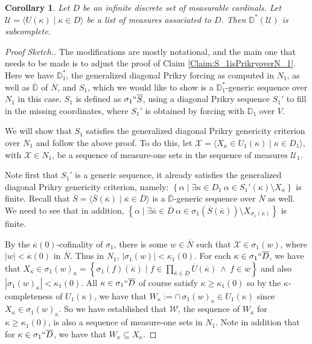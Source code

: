 \documentclass{amsart}
\newtheorem{corollary}[theorem]{Corollary}
\theoremstyle{definition}
\theoremstyle{remark}
\newcommand{\D}{\mathbb{D}}
\newcommand{\N}{{\overline{N}}}
\renewcommand{\S}{{\overline{S}}}
\newcommand{\U}{\mathcal{U}}
\newcommand{\st}{\; | \;}
\newcommand{\set}[2]{\left\{#1\st #2 \right\}}
\newcommand{\seq}[2]{\langle #1 \st #2 \rangle}
\begin{document}
\begin{corollary} 
Let $D$ be an infinite discrete set of measurable cardinals. Let $\U = \seq{ U(\kappa) }{ \kappa \in D }$ be a list of measures associated to $D$. Then $\D^*(\U)$ is subcomplete.
\end{corollary}
\begin{proof}[Proof Sketch.]
The modifications are mostly notational, and the main one that needs to be made is to adjust the proof of Claim \ref{Claim:S_1isPrikryoverN_1}. Here we have $\D^*_1$, the generalized diagonal Prikry forcing as computed in $N_1$, as well as $\overline{\D}$ of $\N$, and $S_1$, which we would like to show is a $\D_1^*$-generic sequence over $N_1$ in this case. $S_1$ is defined as $\sigma_1 ``\overline S$, using a diagonal Prikry sequence $S_1'$ to fill in the missing coordinates, where $S_1'$ is obtained by forcing with $\D_1$ over $V$.

We will show that $S_1$ satisfies the generalized diagonal Prikry genericity criterion over $N_1$ and follow the above proof. To do this, let $\mathcal X = \seq{ X_\kappa \in U_1(\kappa) }{ \kappa \in D_1 }$, with $\mathcal X \in N_1$, be a sequence of measure-one sets in the sequence of measures $\U_1$.

Note first that $S_1'$ is a generic sequence, it already satisfies the generalized diagonal Prikry genericity criterion, namely:
$\set{ \alpha }{ \exists \kappa \in D_1 \ \alpha \in S_1'(\kappa) \setminus X_\kappa }$ is finite.
Recall that $\S = \seq{ \S(\overline \kappa) }{ \overline \kappa \in \overline D }$ is a $\overline{\D}$-generic sequence over $\N$ as well.
We need to see that in addition, $\set{ \alpha }{ \exists \overline \kappa \in \overline D \ \alpha \in \sigma_1(\S(\overline \kappa)) \setminus X_{\sigma_1(\overline \kappa)} }$ is finite.

By the $\overline{\kappa}(0)$-cofinality of $\sigma_1$, there is some $w \in \N$ such that $\mathcal X \in \sigma_1(w)$, where $|w| < \overline{\kappa}(0)$ in $\N$. Thus in $N_1$, $|\sigma_1(w)| < \kappa_1(0)$. 
For each $\kappa \in \sigma_1``\overline D$, we have that $X_\kappa \in \sigma_1(w)_\kappa = \set{\sigma_1(f)(\overline \kappa) }{ f \in \prod_{\overline \kappa \in \overline D} \overline U(\overline \kappa) \ \land \ f \in w }$ and also $|\sigma_1(w)_\kappa|<\kappa_1(0).$ All $\kappa \in \sigma_1``\overline D$ of course satisfy $\kappa \geq \kappa_1(0)$ so by the $\kappa$-completeness of $U_1(\kappa)$, we have that $W_\kappa := \cap \, \sigma_1(w)_\kappa \in U_1(\kappa)$ since $X_\kappa \in \sigma_1(w)_\kappa$.
So we have established that $\mathcal W$, the sequence of $W_\kappa$ for $\kappa \geq \kappa_1(0)$, is also a sequence of measure-one sets in $N_1$. Note in addition that for $\kappa \in \sigma_1``\overline D$, we have that $W_\kappa \subseteq X_\kappa$. 


\end{proof}
\end{document}
